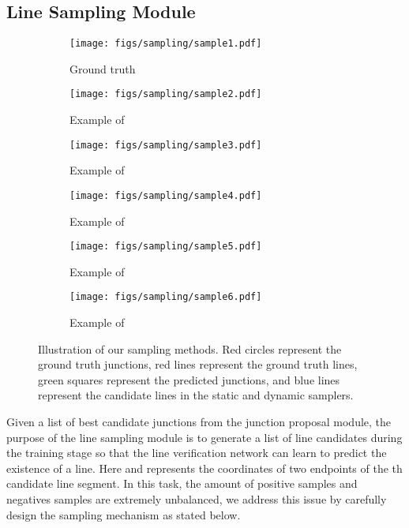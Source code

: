\documentclass[10pt,twocolumn,letterpaper]{article}
\newcommand{\requireJunctype}[1]{}
\begin{document}
\subsection{Line Sampling Module} \label{sec:proposal}

\begin{figure}[t]
    \centering
    \begin{subfigure}[b]{0.32\linewidth}
        \centering
        \texttt{[image: figs/sampling/sample1.pdf]} 
        \caption{Ground truth}
    \end{subfigure}
    \begin{subfigure}[b]{0.32\linewidth}
        \centering
        \texttt{[image: figs/sampling/sample2.pdf]} 
        \caption{Example of }
    \end{subfigure}
    \begin{subfigure}[b]{0.32\linewidth}
        \centering
        \texttt{[image: figs/sampling/sample3.pdf]} 
        \caption{Example of }
    \end{subfigure}
    
    \vspace{5pt}
    
    \begin{subfigure}[b]{0.32\linewidth}
        \centering
        \texttt{[image: figs/sampling/sample4.pdf]} 
        \caption{Example of }
    \end{subfigure}
    \begin{subfigure}[b]{0.32\linewidth}
        \centering
        \texttt{[image: figs/sampling/sample5.pdf]} 
        \caption{Example of }
    \end{subfigure}
    \begin{subfigure}[b]{0.32\linewidth}
        \centering
        \texttt{[image: figs/sampling/sample6.pdf]} 
        \caption{Example of }
    \end{subfigure}
    
    \caption{Illustration of our sampling methods. Red circles represent the ground truth junctions, red lines represent the ground truth lines, green squares represent the predicted junctions, and blue lines represent the candidate lines in the static and dynamic samplers.}
    \label{fig:sampler}
\end{figure}

Given a list of  best candidate junctions \requireJunctype{ and potentially their junction types } from the junction proposal module, the purpose of the line sampling module is to generate a list of line candidates  during the training stage so that the line verification network can learn to predict the existence of a line. Here  and  represents the coordinates of two endpoints of the th candidate line segment. In this task, the amount of positive samples and negatives samples are extremely unbalanced, we address this issue by carefully design the sampling mechanism as stated below.
\end{document}
